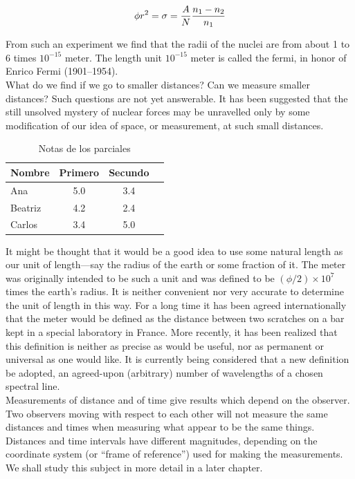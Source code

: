 \documentclass{article}
\begin{document}
	\begin{equation}
	\centering
		\phi r^{2} = \sigma = \frac{A}{N} \frac{n_{1} - n_{2}}{n_{1}}
		\label{Equ1}
	\end{equation}

	From such an experiment we find that the radii of the nuclei are from about 1 to 6 times $10^{-15}$ meter. The length unit $10^{-15}$ meter is called the fermi, in honor of Enrico Fermi (1901–1954).\\

	What do we find if we go to smaller distances? Can we measure smaller distances? Such questions are not yet answerable. It has been suggested that the still unsolved mystery of nuclear forces may be unravelled only by some modification of our idea of space, or measurement, at such small distances.\\

	\begin{table}[h] %
	\centering
		\begin{tabular}{| l | c | c | c}
			\hline
			Nombre & Primero & Secundo \\ \hline
			Ana & 5.0 & 3.4 \\ \hline
			Beatriz & 4.2 & 2.4 \\ \hline
			Carlos & 3.4 & 5.0 \\ \hline
		\end{tabular}
	\caption{Notas de los parciales}
	\label{Ta: Notas}
	\end{table}

	It might be thought that it would be a good idea to use some natural length as our unit of length—say the radius of the earth or some fraction of it. The meter was originally intended to be such a unit and was defined to be $(\phi / 2) \times 10^{7}$ times the earth’s radius. It is neither convenient nor very accurate to determine the unit of length in this way. For a long time it has been agreed internationally that the meter would be defined as the distance between two scratches on a bar kept in a special laboratory in France. More recently, it has been realized that this definition is neither as precise as would be useful, nor as permanent or universal as one would like. It is currently being considered that a new definition be adopted, an agreed-upon (arbitrary) number of wavelengths of a chosen spectral line.\\ 

	Measurements of distance and of time give results which depend on the observer. Two observers moving with respect to each other will not measure the same distances and times when measuring what appear to be the same things. Distances and time intervals have different magnitudes, depending on the coordinate system (or “frame of reference”) used for making the measurements. We shall study this subject in more detail in a later chapter.\\ 
\end{document}
